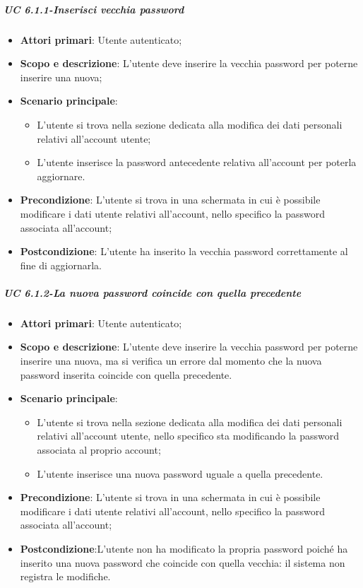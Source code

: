             \subparagraph{UC 6.1.1-Inserisci vecchia password}
                \begin{itemize}
                \item \textbf{Attori primari}: Utente autenticato;
               
                \item \textbf{Scopo e descrizione}: L'utente deve inserire la vecchia password per poterne inserire una nuova;
                \item \textbf{Scenario principale}:
                    \begin{itemize}
                        \item L'utente si trova nella sezione dedicata alla modifica dei dati personali relativi all'account utente;
                        \item L'utente inserisce la password antecedente relativa all'account per poterla aggiornare.
                    \end{itemize}
                \item \textbf{Precondizione}: L'utente si trova in una schermata in cui è possibile modificare i dati utente relativi all'account, nello specifico la password associata all'account;
                \item \textbf{Postcondizione}: L’utente ha inserito la vecchia password correttamente al fine di aggiornarla.
            \end{itemize}
        
        
         \subparagraph{UC 6.1.2-La nuova password coincide con quella precedente}
             \begin{itemize}
                \item \textbf{Attori primari}: Utente autenticato;
               
                \item \textbf{Scopo e descrizione}: L'utente deve inserire la vecchia password per poterne inserire una nuova, ma si verifica un errore dal momento che la nuova password inserita coincide con quella precedente.
                \item \textbf{Scenario principale}:
                    \begin{itemize}
                        \item L'utente si trova nella sezione dedicata alla modifica dei dati personali relativi all'account utente, nello specifico sta modificando la password associata al proprio account;
                        \item L'utente inserisce una nuova password uguale a quella precedente.
                    \end{itemize}
                \item \textbf{Precondizione}: L'utente si trova in una schermata in cui è possibile modificare i dati utente relativi all'account, nello specifico la password associata all'account;
                \item \textbf{Postcondizione}:L’utente non ha modificato la propria password poiché ha inserito una nuova password che coincide con quella vecchia: il sistema non registra le modifiche.
            \end{itemize}
        
